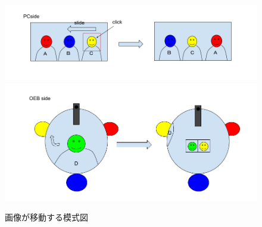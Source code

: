 

\begin{figure}[tp]
  \centering
  \includegraphics[scale=0.7]{fig/OEBimgSlide.png}
  \includegraphics[scale=0.7]{fig/PCimgSlide.png}
  \caption{画像が移動する模式図}
\end{figure}
